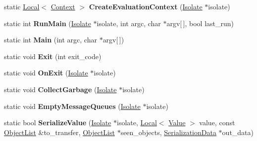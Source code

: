 \begin{DoxyCompactItemize}
\item 
static \hyperlink{classv8_1_1_local}{Local}$<$ \hyperlink{classv8_1_1_context}{Context} $>$ {\bfseries Create\+Evaluation\+Context} (\hyperlink{classv8_1_1_isolate}{Isolate} $\ast$isolate)\hypertarget{classv8_1_1_shell_a7e4313b0046d027e73a03e6665821493}{}\label{classv8_1_1_shell_a7e4313b0046d027e73a03e6665821493}

\item 
static int {\bfseries Run\+Main} (\hyperlink{classv8_1_1_isolate}{Isolate} $\ast$isolate, int argc, char $\ast$argv\mbox{[}$\,$\mbox{]}, bool last\+\_\+run)\hypertarget{classv8_1_1_shell_ad869dfefa18309958f1bcc4f86cc8a2a}{}\label{classv8_1_1_shell_ad869dfefa18309958f1bcc4f86cc8a2a}

\item 
static int {\bfseries Main} (int argc, char $\ast$argv\mbox{[}$\,$\mbox{]})\hypertarget{classv8_1_1_shell_a057dfc36cac04373f5f6868b051be008}{}\label{classv8_1_1_shell_a057dfc36cac04373f5f6868b051be008}

\item 
static void {\bfseries Exit} (int exit\+\_\+code)\hypertarget{classv8_1_1_shell_aa9e863415a8d0f603a18a929651ebef6}{}\label{classv8_1_1_shell_aa9e863415a8d0f603a18a929651ebef6}

\item 
static void {\bfseries On\+Exit} (\hyperlink{classv8_1_1_isolate}{Isolate} $\ast$isolate)\hypertarget{classv8_1_1_shell_a2d7f0ea798fb804ab288b801c2997449}{}\label{classv8_1_1_shell_a2d7f0ea798fb804ab288b801c2997449}

\item 
static void {\bfseries Collect\+Garbage} (\hyperlink{classv8_1_1_isolate}{Isolate} $\ast$isolate)\hypertarget{classv8_1_1_shell_ad46dde06dc1dbf8c048b6ad7c55686c9}{}\label{classv8_1_1_shell_ad46dde06dc1dbf8c048b6ad7c55686c9}

\item 
static void {\bfseries Empty\+Message\+Queues} (\hyperlink{classv8_1_1_isolate}{Isolate} $\ast$isolate)\hypertarget{classv8_1_1_shell_a6d067937dac0f7ec522a03db059fe611}{}\label{classv8_1_1_shell_a6d067937dac0f7ec522a03db059fe611}

\item 
static bool {\bfseries Serialize\+Value} (\hyperlink{classv8_1_1_isolate}{Isolate} $\ast$isolate, \hyperlink{classv8_1_1_local}{Local}$<$ \hyperlink{classv8_1_1_value}{Value} $>$ value, const \hyperlink{classv8_1_1internal_1_1_list}{Object\+List} \&to\+\_\+transfer, \hyperlink{classv8_1_1internal_1_1_list}{Object\+List} $\ast$seen\+\_\+objects, \hyperlink{classv8_1_1_serialization_data}{Serialization\+Data} $\ast$out\+\_\+data)\hypertarget{classv8_1_1_shell_a8d22e547478d8bb20d240643c40e2f2e}{}\label{classv8_1_1_shell_a8d22e547478d8bb20d240643c40e2f2e}


\end{DoxyCompactItemize}
